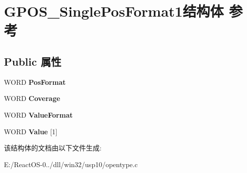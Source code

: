 \hypertarget{struct_g_p_o_s___single_pos_format1}{}\section{G\+P\+O\+S\+\_\+\+Single\+Pos\+Format1结构体 参考}
\label{struct_g_p_o_s___single_pos_format1}
\subsection*{Public 属性}
\begin{DoxyCompactItemize}
\item 
\mbox{\label{struct_g_p_o_s___single_pos_format1_a5a524a95c9f7623784c1f7e9ad303256}} 
W\+O\+RD {\bfseries Pos\+Format}
\item 
\mbox{\label{struct_g_p_o_s___single_pos_format1_a0f247ad9a027c501b5fdd691f99fadfd}} 
W\+O\+RD {\bfseries Coverage}
\item 
\mbox{\label{struct_g_p_o_s___single_pos_format1_a6e096788ba17928581c129a03df0b7d9}} 
W\+O\+RD {\bfseries Value\+Format}
\item 
\mbox{\label{struct_g_p_o_s___single_pos_format1_ad727a8b284c854991e834ec752f65349}} 
W\+O\+RD {\bfseries Value} \mbox{[}1\mbox{]}
\end{DoxyCompactItemize}


该结构体的文档由以下文件生成\+:\begin{DoxyCompactItemize}
\item 
E\+:/\+React\+O\+S-\/0../dll/win32/usp10/opentype.\+c\end{DoxyCompactItemize}
